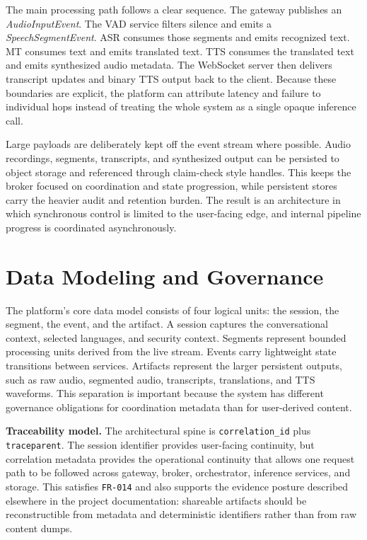 The main processing path follows a clear sequence. The gateway publishes an \emph{AudioInputEvent}. The VAD service filters silence and emits a \emph{SpeechSegmentEvent}. ASR consumes those segments and emits recognized text. MT consumes text and emits translated text. TTS consumes the translated text and emits synthesized audio metadata. The WebSocket server then delivers transcript updates and binary TTS output back to the client. Because these boundaries are explicit, the platform can attribute latency and failure to individual hops instead of treating the whole system as a single opaque inference call.

Large payloads are deliberately kept off the event stream where possible. Audio recordings, segments, transcripts, and synthesized output can be persisted to object storage and referenced through claim-check style handles. This keeps the broker focused on coordination and state progression, while persistent stores carry the heavier audit and retention burden. The result is an architecture in which synchronous control is limited to the user-facing edge, and internal pipeline progress is coordinated asynchronously.

\section{Data Modeling and Governance}
\label{sec:data_modeling}

The platform's core data model consists of four logical units: the session, the segment, the event, and the artifact. A session captures the conversational context, selected languages, and security context. Segments represent bounded processing units derived from the live stream. Events carry lightweight state transitions between services. Artifacts represent the larger persistent outputs, such as raw audio, segmented audio, transcripts, translations, and TTS waveforms. This separation is important because the system has different governance obligations for coordination metadata than for user-derived content.

\textbf{Traceability model.} The architectural spine is \texttt{correlation\_id} plus \texttt{traceparent}. The session identifier provides user-facing continuity, but correlation metadata provides the operational continuity that allows one request path to be followed across gateway, broker, orchestrator, inference services, and storage. This satisfies \texttt{FR-014} and also supports the evidence posture described elsewhere in the project documentation: shareable artifacts should be reconstructible from metadata and deterministic identifiers rather than from raw content dumps.

